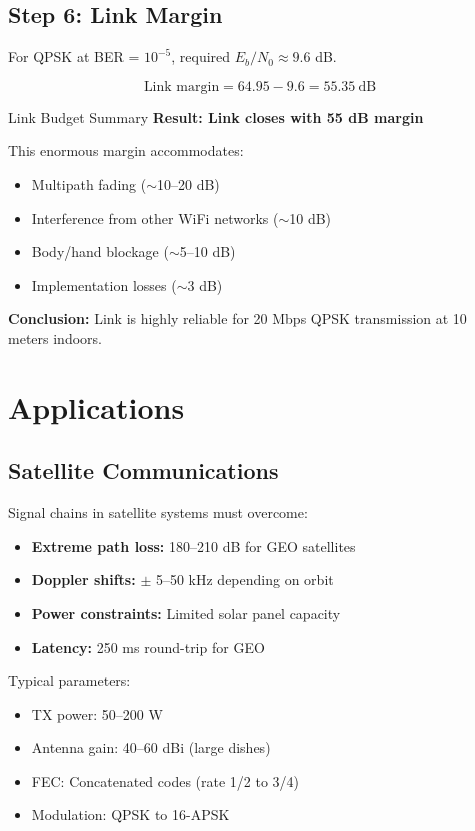 \subsection*{Step 6: Link Margin}

For QPSK at BER = $10^{-5}$, required $E_b/N_0 \approx 9.6$ dB.

\begin{equation}
\text{Link margin} = 64.95 - 9.6 = 55.35\ \text{dB}
\end{equation}

\begin{calloutbox}[colback=black!8!white,colframe=black]{Link Budget Summary}
\textbf{Result: Link closes with 55 dB margin}

This enormous margin accommodates:
\begin{itemize}
\item Multipath fading ($\sim$10--20 dB)
\item Interference from other WiFi networks ($\sim$10 dB)
\item Body/hand blockage ($\sim$5--10 dB)
\item Implementation losses ($\sim$3 dB)
\end{itemize}

\textbf{Conclusion:} Link is highly reliable for 20 Mbps QPSK transmission at 10 meters indoors.
\end{calloutbox}

\section{Applications}

\subsection{Satellite Communications}

Signal chains in satellite systems must overcome:
\begin{itemize}
\item \textbf{Extreme path loss:} 180--210 dB for GEO satellites
\item \textbf{Doppler shifts:} $\pm$ 5--50 kHz depending on orbit
\item \textbf{Power constraints:} Limited solar panel capacity
\item \textbf{Latency:} 250 ms round-trip for GEO
\end{itemize}

Typical parameters:
\begin{itemize}
\item TX power: 50--200 W
\item Antenna gain: 40--60 dBi (large dishes)
\item FEC: Concatenated codes (rate 1/2 to 3/4)
\item Modulation: QPSK to 16-APSK
\end{itemize}

